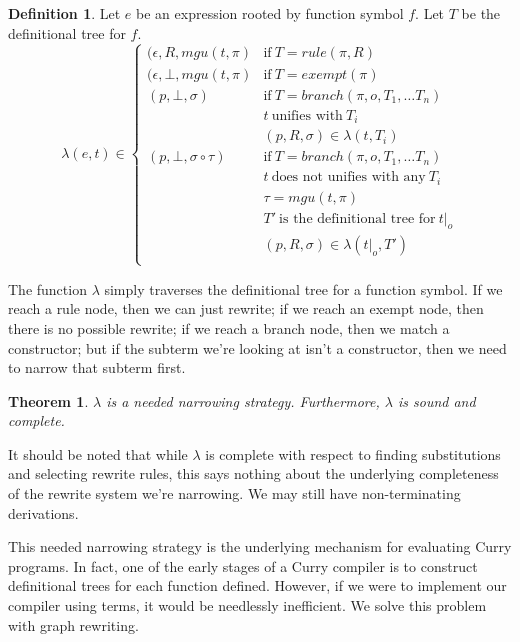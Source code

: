 \documentclass{book}
\newtheorem{theorem}{Theorem}
\theoremstyle{definition}
\newtheorem{definition}{Definition}[section]
\begin{document}
\theoremstyle{definition}
\begin{definition}
    Let $e$ be an expression rooted by function symbol $f$.
    Let $T$ be the definitional tree for $f$.
    $$\lambda(e,t) \in  
    \begin{cases}
        (\epsilon, R,    mgu(t, \pi) & \text{if}\ T = rule(\pi, R) \\
        (\epsilon, \bot, mgu(t, \pi) & \text{if}\ T = exempt(\pi) \\
        (p, \bot, \sigma)            & \text{if}\ T = branch(\pi, o, T_1, \ldots T_n) \\
                                     & t\ \text{unifies with}\ T_i \\
                                     & (p, R, \sigma) \in \lambda(t, T_i) \\
        (p, \bot, \sigma \circ \tau) & \text{if}\ T = branch(\pi, o, T_1, \ldots T_n) \\
                                     & t\ \text{does not unifies with any}\ T_i \\
                                     & \tau = mgu(t, \pi) \\
                                     & T'\ \text{is the definitional tree for}\ t\vert_o \\
                                     & (p, R, \sigma) \in \lambda(t\vert_o, T') \\
    \end{cases}
    $$
\end{definition}

The function $\lambda$ simply traverses the definitional tree for a function symbol.
If we reach a rule node, then we can just rewrite;
if we reach an exempt node, then there is no possible rewrite;
if we reach a branch node, then we match a constructor;
but if the subterm we're looking at isn't a constructor, then we need to narrow that subterm first.


\begin{theorem}
    $\lambda$ is a needed narrowing strategy.
    Furthermore, $\lambda$ is sound and complete.
\end{theorem}

It should be noted that while $\lambda$ is complete with respect to finding substitutions
and selecting rewrite rules,
this says nothing about the underlying completeness of the rewrite system we're narrowing.
We may still have non-terminating derivations.

This needed narrowing strategy is the underlying mechanism for evaluating Curry programs.
In fact, one of the early stages of a Curry compiler is to construct definitional trees
for each function defined.
However, if we were to implement our compiler using terms, it would be needlessly inefficient.
We solve this problem with graph rewriting.
\end{document}
